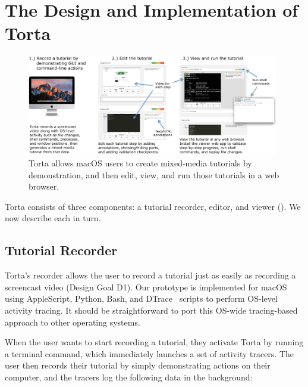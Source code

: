 


\section{The Design and Implementation of Torta}

\begin{figure}
\centering
\includegraphics[width=0.98\textwidth]{figures/torta/torta-overview.png}

\caption{Torta allows macOS users to create mixed-media tutorials
by demonstration, and then edit, view, and run those tutorials in a web
browser.}

\label{fig:torta-overview}
\end{figure}

Torta consists of three components: a tutorial recorder, editor, and
viewer (). We now describe each in turn.


\subsection{Tutorial Recorder}

Torta's recorder allows the user to record a tutorial just as easily as
recording a screencast video (Design Goal D1).
%
Our prototype is implemented for macOS using AppleScript, Python, Bash,
and DTrace~\cite{Cantrill2004} scripts to perform OS-level activity tracing. It
should be straightforward to port this OS-wide tracing-based approach to other
operating systems.


When the user wants to start recording a tutorial, they activate Torta
by running a terminal command, which immediately launches a set of
activity tracers. The user then records their tutorial by simply
demonstrating actions on their computer, and the tracers log the
following data in the background:

